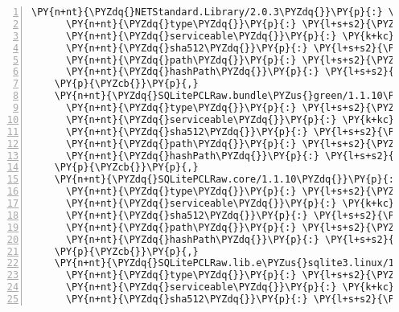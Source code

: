 \begin{Verbatim}[commandchars=\\\{\},numbers=left,firstnumber=1,stepnumber=1,numberblanklines=0]
    \PY{n+nt}{\PYZdq{}NETStandard.Library/2.0.3\PYZdq{}}\PY{p}{:} \PY{p}{\PYZob{}}
      \PY{n+nt}{\PYZdq{}type\PYZdq{}}\PY{p}{:} \PY{l+s+s2}{\PYZdq{}package\PYZdq{}}\PY{p}{,}
      \PY{n+nt}{\PYZdq{}serviceable\PYZdq{}}\PY{p}{:} \PY{k+kc}{true}\PY{p}{,}
      \PY{n+nt}{\PYZdq{}sha512\PYZdq{}}\PY{p}{:} \PY{l+s+s2}{\PYZdq{}sha512\PYZhy{}st47PosZSHrjECdjeIzZQbzivYBJFv6P2nv4cj2ypdI204DO+vZ7l5raGMiX4eXMJ53RfOIg+/s4DHVZ54Nu2A==\PYZdq{}}\PY{p}{,}
      \PY{n+nt}{\PYZdq{}path\PYZdq{}}\PY{p}{:} \PY{l+s+s2}{\PYZdq{}netstandard.library/2.0.3\PYZdq{}}\PY{p}{,}
      \PY{n+nt}{\PYZdq{}hashPath\PYZdq{}}\PY{p}{:} \PY{l+s+s2}{\PYZdq{}netstandard.library.2.0.3.nupkg.sha512\PYZdq{}}
    \PY{p}{\PYZcb{}}\PY{p}{,}
    \PY{n+nt}{\PYZdq{}SQLitePCLRaw.bundle\PYZus{}green/1.1.10\PYZdq{}}\PY{p}{:} \PY{p}{\PYZob{}}
      \PY{n+nt}{\PYZdq{}type\PYZdq{}}\PY{p}{:} \PY{l+s+s2}{\PYZdq{}package\PYZdq{}}\PY{p}{,}
      \PY{n+nt}{\PYZdq{}serviceable\PYZdq{}}\PY{p}{:} \PY{k+kc}{true}\PY{p}{,}
      \PY{n+nt}{\PYZdq{}sha512\PYZdq{}}\PY{p}{:} \PY{l+s+s2}{\PYZdq{}sha512\PYZhy{}J1r1DFRpCKSLgdIf+aWfKuQyXhyhXwbhb89D7h1d/uuFOG31w3MGh493AHDLgmXsI5+w61ft9RMHMRxgvlGwMA==\PYZdq{}}\PY{p}{,}
      \PY{n+nt}{\PYZdq{}path\PYZdq{}}\PY{p}{:} \PY{l+s+s2}{\PYZdq{}sqlitepclraw.bundle\PYZus{}green/1.1.10\PYZdq{}}\PY{p}{,}
      \PY{n+nt}{\PYZdq{}hashPath\PYZdq{}}\PY{p}{:} \PY{l+s+s2}{\PYZdq{}sqlitepclraw.bundle\PYZus{}green.1.1.10.nupkg.sha512\PYZdq{}}
    \PY{p}{\PYZcb{}}\PY{p}{,}
    \PY{n+nt}{\PYZdq{}SQLitePCLRaw.core/1.1.10\PYZdq{}}\PY{p}{:} \PY{p}{\PYZob{}}
      \PY{n+nt}{\PYZdq{}type\PYZdq{}}\PY{p}{:} \PY{l+s+s2}{\PYZdq{}package\PYZdq{}}\PY{p}{,}
      \PY{n+nt}{\PYZdq{}serviceable\PYZdq{}}\PY{p}{:} \PY{k+kc}{true}\PY{p}{,}
      \PY{n+nt}{\PYZdq{}sha512\PYZdq{}}\PY{p}{:} \PY{l+s+s2}{\PYZdq{}sha512\PYZhy{}PdsYh0UfhvnVHooSjDSdqzK0mo9HMxLjA6dAOGB88oN9nD9rMrn+zMKi7YKoiKFuVPwcEegO3rQboNUTxp+lZw==\PYZdq{}}\PY{p}{,}
      \PY{n+nt}{\PYZdq{}path\PYZdq{}}\PY{p}{:} \PY{l+s+s2}{\PYZdq{}sqlitepclraw.core/1.1.10\PYZdq{}}\PY{p}{,}
      \PY{n+nt}{\PYZdq{}hashPath\PYZdq{}}\PY{p}{:} \PY{l+s+s2}{\PYZdq{}sqlitepclraw.core.1.1.10.nupkg.sha512\PYZdq{}}
    \PY{p}{\PYZcb{}}\PY{p}{,}
    \PY{n+nt}{\PYZdq{}SQLitePCLRaw.lib.e\PYZus{}sqlite3.linux/1.1.10\PYZdq{}}\PY{p}{:} \PY{p}{\PYZob{}}
      \PY{n+nt}{\PYZdq{}type\PYZdq{}}\PY{p}{:} \PY{l+s+s2}{\PYZdq{}package\PYZdq{}}\PY{p}{,}
      \PY{n+nt}{\PYZdq{}serviceable\PYZdq{}}\PY{p}{:} \PY{k+kc}{true}\PY{p}{,}
      \PY{n+nt}{\PYZdq{}sha512\PYZdq{}}\PY{p}{:} \PY{l+s+s2}{\PYZdq{}sha512\PYZhy{}Z6OsGbVMrS0ZRDW7ZMGgD4UGGtAJi/rw3p4PfkXq/H9Iq2BrV97Mj6NUKxW/M03tWmWKPptLYa+KOcVwtKd5Lw==\PYZdq{}}\PY{p}{,}

\end{Verbatim}
